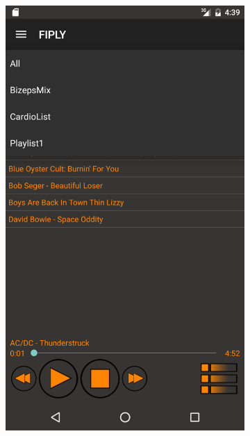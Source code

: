 \documentclass[FIPLY_base.tex]{subfiles}
\begin{document}
\begin{figure}[H]
	\begin{subfigure}[b]{0.3\textwidth}
	\includegraphics[scale=0.17]{img/musicListenView1}
	\end{subfigure}
	\hfil
	\begin{subfigure}[b]{0.3\textwidth}

\end{subfigure}
\end{figure}
\end{document}
